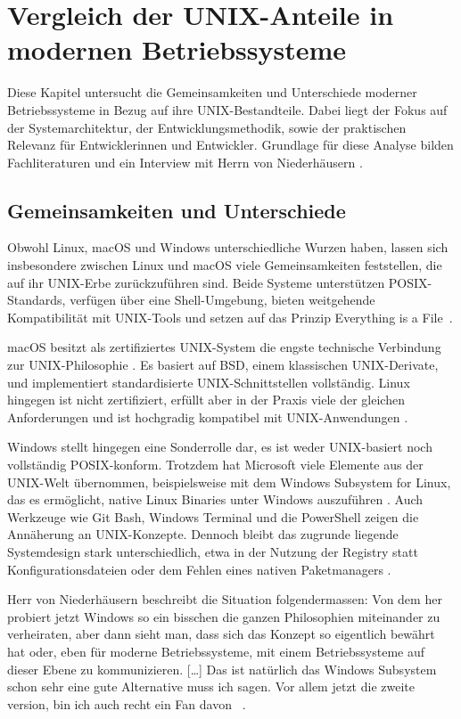 \section{Vergleich der UNIX-Anteile in modernen Betriebssysteme}

Diese Kapitel untersucht die Gemeinsamkeiten und Unterschiede moderner Betriebssysteme in Bezug auf ihre UNIX-Bestandteile. Dabei liegt der Fokus auf der
Systemarchitektur, der Entwicklungsmethodik, sowie der praktischen Relevanz für Entwicklerinnen und Entwickler. Grundlage für diese Analyse bilden Fachliteraturen
und ein Interview mit Herrn von Niederhäusern \cite{interviewNH}.


\subsection{Gemeinsamkeiten und Unterschiede}

Obwohl Linux, macOS und Windows unterschiedliche Wurzen haben, lassen sich insbesondere zwischen Linux und macOS viele Gemeinsamkeiten feststellen, die auf ihr
UNIX-Erbe zurückzuführen sind. Beide Systeme unterstützen POSIX-Standards, verfügen über eine Shell-Umgebung, bieten weitgehende Kompatibilität mit UNIX-Tools und
setzen auf das Prinzip \glqq Everything is a File\grqq \ \cite{ArtOfUnixProgramming, ModernOS, OSConcept}.

macOS besitzt als zertifiziertes UNIX-System die engste technische Verbindung zur UNIX-Philosophie \cite{FreeBSDOS}. Es basiert auf BSD, einem klassischen
UNIX-Derivate, und implementiert standardisierte UNIX-Schnittstellen vollständig. Linux hingegen ist nicht zertifiziert, erfüllt aber in der Praxis viele der
gleichen Anforderungen und ist hochgradig kompatibel mit UNIX-Anwendungen \cite{ModernOS, OSConcept}.

Windows stellt hingegen eine Sonderrolle dar, es ist weder UNIX-basiert noch vollständig POSIX-konform. Trotzdem hat Microsoft viele Elemente aus der UNIX-Welt
übernommen, beispielsweise mit dem Windows Subsystem for Linux, das es ermöglicht, native Linux Binaries unter Windows auszuführen \cite{WSL}. Auch Werkzeuge
wie Git Bash, Windows Terminal und die PowerShell zeigen die Annäherung an UNIX-Konzepte. Dennoch bleibt das zugrunde liegende Systemdesign stark unterschiedlich,
etwa in der Nutzung der Registry statt Konfigurationsdateien oder dem Fehlen eines nativen Paketmanagers \cite{interviewNH}.

Herr von Niederhäusern beschreibt die Situation folgendermassen: \glqq Von dem her probiert jetzt Windows so ein bisschen die ganzen Philosophien miteinander zu
verheiraten, aber dann sieht man, dass sich das Konzept so eigentlich bewährt hat oder, eben für moderne Betriebssysteme, mit einem Betriebssysteme auf dieser
Ebene zu kommunizieren. [\ldots] Das ist natürlich das Windows Subsystem schon sehr eine gute Alternative muss ich sagen. Vor allem jetzt die zweite version, bin ich
auch recht ein Fan davon \grqq \ \cite{interviewNH}.



